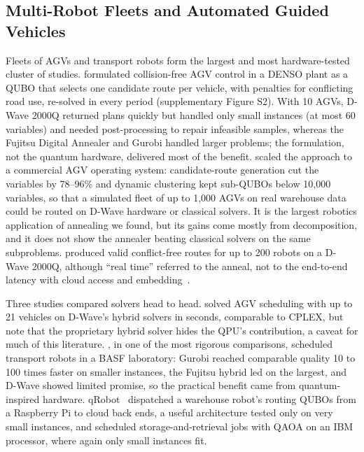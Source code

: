 \documentclass[acmsmall,screen,review]{acmart}
\begin{document}
\subsection{Multi-Robot Fleets and Automated Guided Vehicles}\label{sec:opt-fleets}
Fleets of AGVs and transport robots form the largest and most hardware-tested cluster of studies. \citet{Ohzeki2019} formulated collision-free AGV control in a DENSO plant as a QUBO that selects one candidate route per vehicle, with penalties for conflicting road use, re-solved in every period (supplementary Figure S2). With 10 AGVs, D-Wave 2000Q returned plans quickly but handled only small instances (at most 60 variables) and needed post-processing to repair infeasible samples, whereas the Fujitsu Digital Annealer and Gurobi handled larger problems; the formulation, not the quantum hardware, delivered most of the benefit. \citet{Quang2025} scaled the approach to a commercial AGV operating system: candidate-route generation cut the variables by 78--96\% and dynamic clustering kept sub-QUBOs below 10,000 variables, so that a simulated fleet of up to 1,000 AGVs on real warehouse data could be routed on D-Wave hardware or classical solvers. It is the largest robotics application of annealing we found, but its gains come mostly from decomposition, and it does not show the annealer beating classical solvers on the same subproblems. \citet{Clark2019} produced valid conflict-free routes for up to 200 robots on a D-Wave 2000Q, although ``real time'' referred to the anneal, not to the end-to-end latency with cloud access and embedding~\cite{Ravi2021}.

Three studies compared solvers head to head. \citet{Smierzchalski2024} solved AGV scheduling with up to 21 vehicles on D-Wave's hybrid solvers in seconds, comparable to CPLEX, but note that the proprietary hybrid solver hides the QPU's contribution, a caveat for much of this literature. \citet{Leib2023}, in one of the most rigorous comparisons, scheduled transport robots in a BASF laboratory: Gurobi reached comparable quality 10 to 100 times faster on smaller instances, the Fujitsu hybrid led on the largest, and D-Wave showed limited promise, so the practical benefit came from quantum-inspired hardware. qRobot~\cite{AtchadeAdelomou2021} dispatched a warehouse robot's routing QUBOs from a Raspberry Pi to cloud back ends, a useful architecture tested only on very small instances, and \citet{Windmann2023} scheduled storage-and-retrieval jobs with QAOA on an IBM processor, where again only small instances fit.
\end{document}
